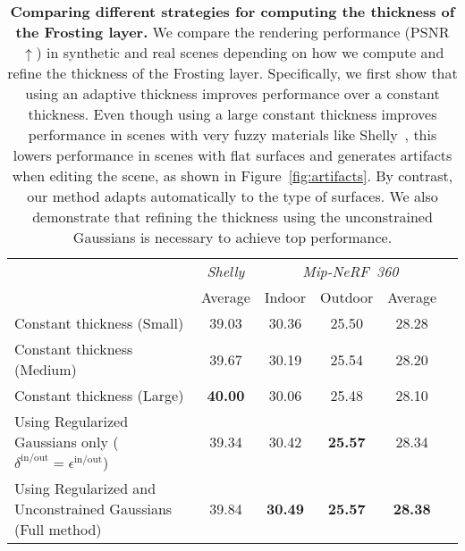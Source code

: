\begin{table}
   \caption{
   \textbf{Comparing different strategies for computing the thickness of the Frosting layer.} We compare the rendering performance (PSNR $\uparrow$) in synthetic and real scenes depending on how we compute and refine the thickness of the Frosting layer. Specifically, we first show that using an adaptive thickness improves performance over a constant thickness. Even though using a large constant thickness improves performance in scenes with very fuzzy materials like Shelly~\cite{wang-siggraphasia2023-adaptive-shells}, this lowers performance in scenes with flat surfaces and generates artifacts when editing the scene, as shown in Figure~\ref{fig:artifacts}. By contrast, our method adapts automatically to the type of surfaces. We also demonstrate that refining the thickness using the unconstrained Gaussians is necessary to achieve top performance.}
  \label{tab:ablation-proposal-intervals}
  \centering
  {\scriptsize
  \begin{tabular}{@{}lccccc@{}}
    \toprule
     \multicolumn{1}{c}{} & \multicolumn{1}{c}{\emph{\> Shelly \>}} & \multicolumn{3}{c}{\emph{Mip-NeRF~360}} \\
    \cmidrule(r){2-2} \cmidrule(r){3-5}
     & Average & Indoor & Outdoor & Average & \\
    \midrule
    Constant thickness (Small)  & 39.03 & \cellcolor{yellow!25}30.36 & 25.50 & \cellcolor{yellow!25}28.28 &  \\
    Constant thickness (Medium)  & \cellcolor{yellow!25}39.67 & 30.19 & \cellcolor{yellow!25}25.54 & 28.20 &  \\
    Constant thickness (Large) & \cellcolor{red!25}\textbf{40.00} & 30.06 & 25.48 & 28.10 &\\
    Using Regularized Gaussians only ($\delta^{\text{in/out}}=\epsilon^{\text{in/out}}$) & 39.34 & \cellcolor{orange!25}30.42 & \cellcolor{red!25}\textbf{25.57} & \cellcolor{orange!25}28.34 &  \\
     Using Regularized and Unconstrained Gaussians (Full method)  & \cellcolor{orange!25}39.84 & \cellcolor{red!25}\textbf{30.49} & \cellcolor{red!25}\textbf{25.57} & \cellcolor{red!25}\textbf{28.38} & \\
    \bottomrule
  \end{tabular}
  }
\end{table}
